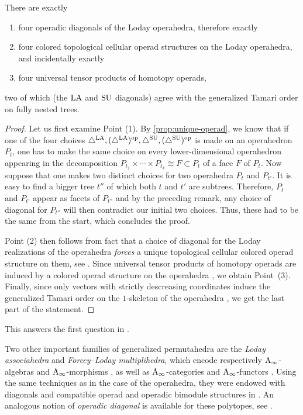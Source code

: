 \begin{theorem} 
    \label{thm:operahedra}
There are exactly 
\begin{enumerate}
    \item four operadic diagonals of the Loday operahedra, therefore exactly
    \item four colored topological cellular operad structures on the Loday operahedra, and incidentally exactly
    \item four universal tensor products of homotopy operads,
\end{enumerate}
two of which (the $\mathrm{LA}$ and $\mathrm{SU}$ diagonals) agree with the generalized Tamari order on fully nested trees. 
\end{theorem}

\begin{proof}
    Let us first examine Point (1).
    By \cref{prop:unique-operad}, we know that if one of the four choices $\triangle^{\mathrm{LA}}, (\triangle^{\mathrm{LA}})^{\mathrm{op}}, \triangle^{\mathrm{SU}}, (\triangle^{\mathrm{SU}})^{\mathrm{op}}$ is made on an operahedron $P_t$, one has to make the same choice on every lower-dimensional operahedron appearing in the decomposition $P_{t_1} \times \cdots \times P_{t_k} \cong F \subset P_t$ of a face $F$ of $P_t$. 
    Now suppose that one makes two distinct choices for two operahedra $P_t$ and $P_{t'}$.
    It is easy to find a bigger tree $t''$ of which both $t$ and $t'$ are subtrees.
    Therefore, $P_t$ and $P_{t'}$ appear as facets of $P_{t''}$ and by the preceding remark, any choice of diagonal for $P_{t''}$ will then contradict our initial two choices. 
    Thus, these had to be the same from the start, which concludes the proof. 

    Point (2) then follows from fact that a choice of diagonal for the Loday realizations of the operahedra \emph{forces} a unique topological cellular colored operad structure on them, see \cite[Theorem 4.18]{LA21}.
    Since universal tensor products of homotopy operads are induced by a colored operad structure on the operahedra \cite[Cor. 4.24]{LA21}, we obtain Point~(3).
    Finally, since only vectors with strictly descreasing coordinates induce the generalized Tamari order on the $1$-skeleton of the operahedra \cite[Prop. 3.11]{LA21}, we get the last part of the statement. 
\end{proof}

This answers the first question in \cite[Remark 3.14]{LA21}.

Two other important families of generalized permutahedra are the \emph{Loday associahedra} and \emph{Forcey--Loday multiplihedra}, which encode respectively $\mathrm{A}_\infty$-algebras and $\mathrm{A}_\infty$-morphisms \cite[Prop. 4.9]{MazuirLA22}, as well as $\mathrm{A}_\infty$-categories and $\mathrm{A}_\infty$-functors \cite[Section 4.3]{MazuirLA22}.
Using the same techniques as in the case of the operahedra, they were endowed with diagonals and compatible operad and operadic bimodule structures in \cite[Theorem~1]{MazuirLA22}.
An analogous notion of \emph{operadic diagonal} is available for these polytopes, see \cite[Proposition 2.14]{MazuirLA22}.

